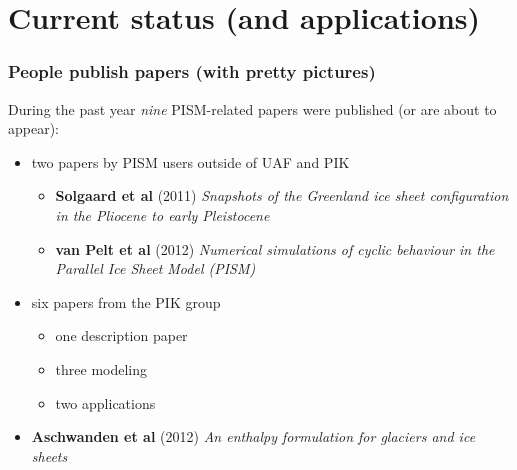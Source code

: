 \documentclass[hide notes,intlimits]{beamer}
\begin{document}
\section[Current status]{Current status (and applications)}

\begin{frame}
  \frametitle{People publish papers (with pretty pictures)}

  During the past year \emph{nine} PISM-related papers were published (or are about to
  appear):

  \begin{itemize}
  \item two papers by PISM users outside of UAF and PIK
    \begin{itemize}
    \item \textbf{Solgaard et al} (2011) \emph{Snapshots of
        the Greenland ice sheet configuration in the Pliocene to early
        Pleistocene}
    \item \textbf{van Pelt et al} (2012) \emph{Numerical
        simulations of cyclic behaviour in the Parallel Ice Sheet Model
        (PISM)}
    \end{itemize}
  \item six papers from the PIK group
    \begin{itemize}
    \item one description paper
    \item three modeling
    \item two applications
    \end{itemize}
  \item \textbf{Aschwanden et al} (2012) \emph{An enthalpy
      formulation for glaciers and ice sheets}
  \end{itemize}

\end{frame}
\end{document}
